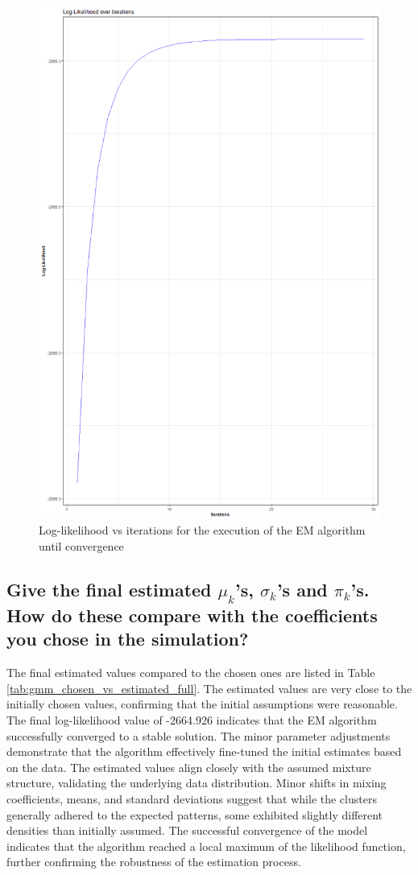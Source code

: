 \documentclass[]{article}
\begin{document}
\begin{figure}[H]
	\centering
	\includegraphics[width=0.7\linewidth]{img/img-5-3}
	\caption{Log-likelihood vs iterations for the execution of the EM algorithm until convergence}
	\label{fig:img-5-3}
\end{figure}

\subsection{Give the final estimated $\mu_k$'s, $\sigma_k$'s and $\pi_k$'s. How do these compare with the coefficients you chose in the simulation?
}


The final estimated values compared to the chosen ones are listed in Table \ref{tab:gmm_chosen_vs_estimated_full}. The estimated values are very close to the initially chosen values, confirming that the initial assumptions were reasonable. The final log-likelihood value of -2664.926 indicates that the EM algorithm successfully converged to a stable solution. The minor parameter adjustments demonstrate that the algorithm effectively fine-tuned the initial estimates based on the data. The estimated values align closely with the assumed mixture structure, validating the underlying data distribution. Minor shifts in mixing coefficients, means, and standard deviations suggest that while the clusters generally adhered to the expected patterns, some exhibited slightly different densities than initially assumed. The successful convergence of the model indicates that the algorithm reached a local maximum of the likelihood function, further confirming the robustness of the estimation process.
\end{document}
